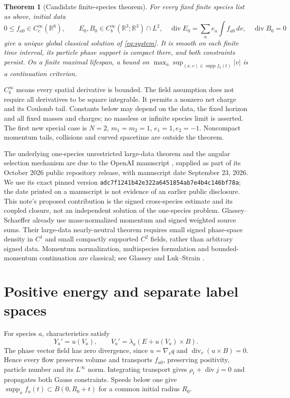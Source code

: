 \documentclass[11pt]{article}
\newcommand{\R}{\mathbb R}
\newcommand{\supp}{\operatorname{supp}}
\newcommand{\diver}{\operatorname{div}}
\newtheorem{theorem}{Theorem}[section]
\theoremstyle{remark}\newtheorem{remark}[theorem]{Remark}
\numberwithin{equation}{section}
\begin{document}
\begin{theorem}[Candidate finite-species theorem]\label{thm:main}
For every fixed finite species list as above, initial data
\begin{equation}\label{eq:data}
 0\le f_{a0}\in C_c^\infty(\R^6),\qquad
 E_0,B_0\in C_b^\infty(\R^3;\R^3)\cap L^2,
 \quad\diver E_0=\sum_a e_a\int f_{a0}\,dv,\quad\diver B_0=0
\end{equation}
give a unique global classical solution of \eqref{eq:system}. It is smooth on
each finite time interval, its particle phase support is compact there,
and both constraints persist. On a finite maximal lifespan, a bound on
$\max_a\sup_{(x,v)\in\supp f_a(t)}|v|$ is a continuation criterion.
\end{theorem}

$C_b^\infty$ means every spatial derivative is bounded. The field assumption
does not require all derivatives to be square integrable. It permits a nonzero
net charge and its Coulomb tail. Constants below may depend on the data,
the fixed horizon and all fixed masses and charges; no massless or infinite
species limit is asserted. The first new special case is $N=2$,
$m_1=m_2=1$, $e_1=1,e_2=-1$. Noncompact momentum tails, collisions and curved
spacetime are outside the theorem.

The underlying one-species unrestricted large-data theorem and the angular
selection mechanism are due to the OpenAI manuscript \cite{OAI362}, supplied
as part of its October 2026 public repository release, with manuscript date
September 23, 2026. We use its exact pinned version
\texttt{adc7f1241b42e322a6451854ab7e4b4c146bf78a}; the date printed on a
manuscript is not evidence of an earlier public disclosure. This note's proposed
contribution is the signed cross-species estimate and its coupled closure,
not an independent solution of the one-species problem. Glassey--Schaeffer
\cite{GlasseySchaeffer1988} already use mass-normalized momentum and signed
weighted source sums. Their large-data nearly-neutral theorem requires small
signed phase-space density in $C^1$ and small compactly supported $C^2$
fields, rather than arbitrary signed data. Momentum normalization,
multispecies formulation and bounded-momentum continuation are classical;
see Glassey \cite{Glassey} and Luk--Strain \cite{LukStrain}.

\section{Positive energy and separate label spaces}
For species $a$, characteristics satisfy
\begin{equation}\label{eq:flow}
 Y_a'=u(V_a),\qquad V_a'=\lambda_a(E+u(V_a)\times B).
\end{equation}
The phase vector field has zero divergence, since $u=\nabla_v q$ and
$\diver_v(u\times B)=0$. Hence every flow preserves volume and transports
$f_{a0}$, preserving positivity, particle number and its $L^\infty$ norm.
Integrating transport gives $\rho_t+\diver j=0$ and propagates both Gauss
constraints. Speeds below one give $\supp_x f_a(t)\subset B(0,R_0+t)$ for a
common initial radius $R_0$.
\end{document}
